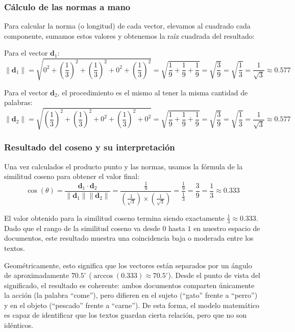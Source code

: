 \documentclass[12pt,a4paper]{article}
\begin{document}
\subsubsection{Cálculo de las normas a mano}

Para calcular la norma (o longitud) de cada vector, elevamos al cuadrado cada componente, sumamos estos valores y obtenemos la raíz cuadrada del resultado:

Para el vector $\mathbf{d}_1$:
\[
\|\mathbf{d}_1\| = \sqrt{0^2 + \left(\frac{1}{3}\right)^2 + \left(\frac{1}{3}\right)^2 + 0^2 + \left(\frac{1}{3}\right)^2} = \sqrt{\frac{1}{9} + \frac{1}{9} + \frac{1}{9}} = \sqrt{\frac{3}{9}} = \sqrt{\frac{1}{3}} = \frac{1}{\sqrt{3}} \approx 0.577
\]

Para el vector $\mathbf{d}_2$, el procedimiento es el mismo al tener la misma cantidad de palabras:
\[
\|\mathbf{d}_2\| = \sqrt{\left(\frac{1}{3}\right)^2 + \left(\frac{1}{3}\right)^2 + 0^2 + \left(\frac{1}{3}\right)^2 + 0^2} = \sqrt{\frac{1}{9} + \frac{1}{9} + \frac{1}{9}} = \sqrt{\frac{3}{9}} = \sqrt{\frac{1}{3}} = \frac{1}{\sqrt{3}} \approx 0.577
\]

\subsubsection{Resultado del coseno y su interpretación}

Una vez calculados el producto punto y las normas, usamos la fórmula de la similitud coseno para obtener el valor final:
\[
\cos(\theta) = \frac{\mathbf{d}_1 \cdot \mathbf{d}_2}{\|\mathbf{d}_1\| \|\mathbf{d}_2\|} = \frac{\frac{1}{9}}{\left(\frac{1}{\sqrt{3}}\right) \times \left(\frac{1}{\sqrt{3}}\right)} = \frac{\frac{1}{9}}{\frac{1}{3}} = \frac{3}{9} = \frac{1}{3} \approx 0.333
\]

El valor obtenido para la similitud coseno termina siendo exactamente $\frac{1}{3} \approx 0.333$. Dado que el rango de la similitud coseno va desde $0$ hasta $1$ en nuestro espacio de documentos, este resultado muestra una coincidencia baja o moderada entre los textos.

Geométricamente, esto significa que los vectores están separados por un ángulo de aproximadamente $70.5^\circ$ ($\arccos(0.333) \approx 70.5^\circ$). Desde el punto de vista del significado, el resultado es coherente: ambos documentos comparten únicamente la acción (la palabra ``come''), pero difieren en el sujeto (``gato'' frente a ``perro'') y en el objeto (``pescado'' frente a ``carne''). De esta forma, el modelo matemático es capaz de identificar que los textos guardan cierta relación, pero que no son idénticos.
\end{document}
